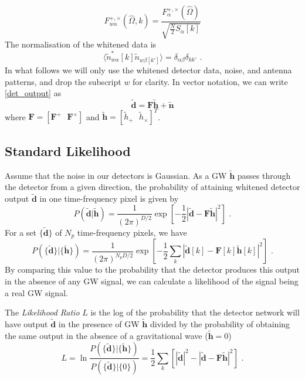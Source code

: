 \documentclass[11pt]{cuthesis}
\newcommand{\fs}{\text{ .}}
\newcommand{\tbd}{\tilde{\textbf{d}}}
\newcommand{\tbh}{\tilde{\textbf{h}}}
\begin{document}
\begin{equation}
F^{+,\times}_{w\alpha}(\hat{\Omega},k)=\frac{F^{+,\times}_\alpha (\hat{\Omega})}{\sqrt{\frac{N}{2}S_\alpha [k]}}
\end{equation}
The normalisation of the whitened data is 
\begin{equation}
\langle  \tilde{n}^*_{w\alpha} [k] \tilde{n}_{w\beta [k']}  \rangle = \delta _{\alpha \beta} \delta _{k k'}  \fs
\end{equation}
In what follows we will only use the whitened detector data, noise, and antenna patterns, and drop the subscript $w$ for clarity. In vector notation, we can write \ref{det_output} as
\begin{equation}
\tilde{\textbf{d}}=\textbf{F}\tilde{\textbf{h}}+\tilde{\textbf{n}} 
\end{equation}
where $\textbf{F}=[\textbf{F}^+ \:\:\:\textbf{F}^\times]$ and $\tilde{\textbf{h}}=[\tilde{h}_+ \:\:\: \tilde{h}_\times]^T$.

\subsection{Standard Likelihood}
Assume that the noise in our detectors is Gaussian. As a GW $\tilde{\textbf{h}}$ passes through the detector from a given direction, the probability of attaining whitened detector output $\tilde{\textbf{d}}$ in one time-frequency pixel is given by
\begin{equation}
P(\tilde{\textbf{d}}|\tilde{\textbf{h}})=\frac{1}{(2\pi )^{D/2}}\exp \left[ -\frac{1}{2} \left| \tbd - \textbf{F} \tbh  \right|^2 \right] \fs
\end{equation}  
For a set $\{ \tbd \}$ of $N_p$ time-frequency pixels, we have
\begin{equation}
P(\{ \tilde{\textbf{d}} \}|\{ \tilde{\textbf{h}} \})=\frac{1}{(2\pi )^{N_p D/2}}\exp \left[- \frac{1}{2} \sum_k \left| \tbd [k] - \textbf{F}[k] \tbh [k]  \right|^2 \right] \fs
\end{equation}  
By comparing this value to the probability that the detector produces this output in the absence of any GW signal, we can calculate a likelihood of the signal being a real GW signal. 

The \emph{Likelihood Ratio} $L$ is the log of the probability that the detector network will have output $ \tilde{\textbf{d}}$ in the presence of GW $\tbh$  divided by the probability of obtaining the same output in the absence of a gravitational wave ($\tbh=0$)
\begin{equation}
L=\ln \frac{P(\{ \tilde{\textbf{d}} \}|\{ \tilde{\textbf{h}} \})}{P(\{ \tilde{\textbf{d}} \}|\{ 0  \})}= \frac{1}{2} \sum_k \left[ \left| \tbd  \right|^2 - \left| \tbd - \textbf{F} \tbh   \right|^2  \right] \fs
\end{equation}
\end{document}
